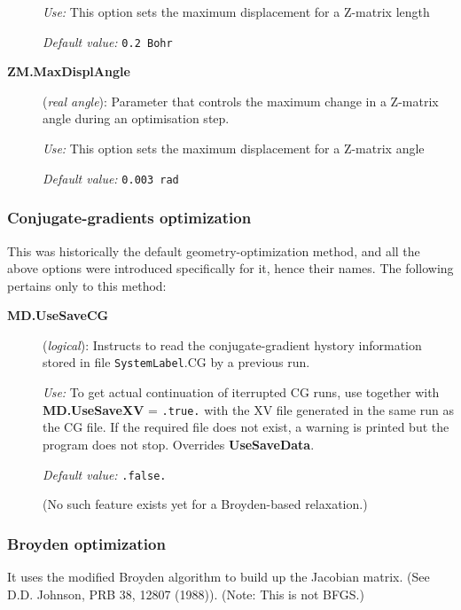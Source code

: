 \begin{description}
\textit{Use:} This option sets the maximum displacement for a Z-matrix length

\textit{Default value:} \texttt{0.2 Bohr}

\item[\textbf{ZM.MaxDisplAngle}] (\textit{real angle}):
   Parameter that
  controls the maximum change in a Z-matrix angle during an
  optimisation step.

\textit{Use:} This option sets the maximum displacement for a Z-matrix angle

\textit{Default value:} \texttt{0.003 rad }

\end{description}

\subsubsection{Conjugate-gradients optimization}

This was historically the default geometry-optimization method, and
all the above options were introduced specifically for it, hence their
names. The following pertains only to this method:

\begin{description}
\item[\textbf{MD.UseSaveCG}] (\textit{logical}):
Instructs to read the conjugate-gradient hystory information stored
in file \texttt{SystemLabel}.CG by a previous run.

\textit{Use:} To get actual continuation of iterrupted CG runs, use
together with \textbf{MD.UseSaveXV} = \texttt{.true.} with the XV
file generated in the same run as the CG file.
If the required file does not exist, a warning is
printed but the program does not stop. Overrides \textbf{UseSaveData}.

\textit{Default value:} \texttt{.false.}

(No such feature exists yet for a Broyden-based relaxation.)

\end{description}

\subsubsection{Broyden optimization}

It uses the modified Broyden algorithm to
build up the Jacobian matrix. (See D.D. Johnson, PRB 38, 12807
(1988)). (Note: This is not BFGS.)

